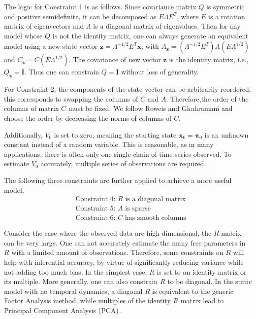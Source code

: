 \documentclass[fleqn,12pt]{article}
\providecommand{\mb}[1]{\boldsymbol{#1}}
\newcommand{\bx}{\mb{x}}
\begin{document}
The logic for Constraint 1 is as follows. Since covariance matrix $Q$ is symmetric and positive semidefinite, it can be decomposed as $E\Lambda E^T$, where $E$ is a rotation matrix of eigenvectors and $\Lambda$ is a diagonal matrix of eigenvalues. Then for any model whose $Q$ is not the identity matrix, one can always generate an equivalent model using a new state vector $\mathbf{z}=\Lambda^{-1/2} E^T \bx$, with $A_{\mathbf{z}}=(\Lambda^{-1/2}E^T)A(E\Lambda^{1/2})$ and $C_{\mathbf{z}}=C(E\Lambda^{1/2})$. The covariance of new vector $\mathbf{z}$ is the identity matrix, i.e., $Q_{\mathbf{z}}=\mathbf{I}$. Thus one can constrain $Q=\mathbf{I}$ without loss of generality.

For Constraint 2, the components of the state vector can be arbitrarily reordered; this corresponds to swapping the columns of $C$ and $A$. Therefore,the order of the columns of matrix $C$ must be fixed. We follow Roweis and Ghahramani and choose the order by decreasing the norms of columns of $C$.

Additionally, $V_0$ is set to zero, meaning the starting state $\bx_0=\mathbf{\pi}_0$ is an unknown constant instead of a random variable. This is reasonable, as in many applications, there is often only one single chain of time series observed. To estimate $V_0$ accurately, multiple series of observations are required.

The following three constraints are further applied to achieve a more useful model.
\vspace*{-3mm}
\begin{equation*}\label{eqn:constraints2}
\begin{aligned}
&\text{Constraint 4: }R\text{ is a diagonal matrix}\\
&\text{Constraint 5: }A\text{ is sparse}\\
&\text{Constraint 6: }C\text{ has smooth columns}
\end{aligned}
\end{equation*}

Consider the case where the observed data are high dimensional, the $R$ matrix can be very large. One can not accurately estimate the many free parameters in $R$ with a limited amount of observations. Therefore, some constraints on $R$ will help with inferential accuracy, by virtue of significantly reducing variance while not adding too much bias. In the simplest case, $R$ is set to an identity matrix or its multiple. More generally, one can also constrain $R$ to be diagonal. In the static model with no temporal dynamics, a diagonal $R$ is equivalent to the generic Factor Analysis method, while multiples of the identity $R$ matrix lead to Principal Component Analysis (PCA) \citep{roweis1999unifying}.
\end{document}
